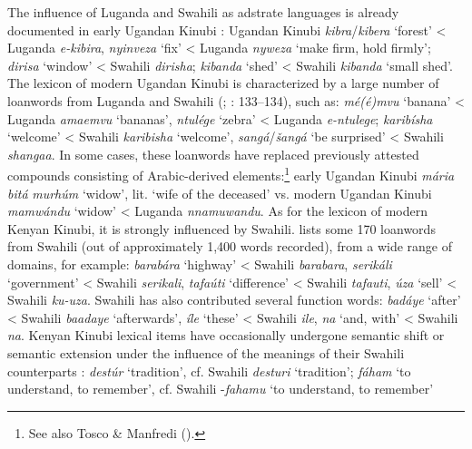 \documentclass[output=paper]{langsci/langscibook}
\begin{document}
The influence of Luganda and Swahili as adstrate languages is already documented in early Ugandan Kinubi \citep{Avram2017talk}: Ugandan Kinubi \textit{kibra}/\textit{kibera} ‘forest’ < Luganda \textit{e-kibira}, \textit{nyinveza} ‘fix’ < Luganda \textit{nyweza} ‘make firm, hold firmly’; \textit{dirisa} ‘window’ < Swahili \textit{dirisha}; \textit{kibanda} ‘shed’ < Swahili \textit{kibanda} ‘small shed’. The lexicon of modern Ugandan Kinubi is characterized by a large number of loanwords from Luganda and Swahili (\citealt{Wellens2003}; \citealt{Nakao2012}: 133–134), such as: \textit{mé(é}\textit{)mvu} ‘banana’ < Luganda \textit{amaemvu} ‘bananas’, \textit{ntulége} ‘zebra’ < Luganda \textit{e-ntulege}; \textit{karibísha} ‘welcome’ < Swahili \textit{karibisha} ‘welcome’, \textit{sangá}/\textit{šangá} ‘be surprised’ < Swahili \textit{shangaa}. In some cases, these loanwords have replaced previously attested compounds consisting of Arabic-derived elements:\footnote{See also Tosco \& Manfredi (\citeyear[509]{ToscoManfredi2013}).} early Ugandan Kinubi \textit{mária} \textit{bitá} \textit{murhúm} ‘widow’, lit. ‘wife of the deceased’ vs. modern Ugandan Kinubi \textit{mamwándu} ‘widow’ < Luganda \textit{nnamuwandu}. As for the lexicon of modern Kenyan Kinubi, it is strongly influenced by Swahili. \citet{Luffin2004} lists some 170 loanwords from Swahili (out of approximately 1,400 words recorded), from a wide range of domains, for example: \textit{barabára} ‘highway’ < Swahili \textit{barabara}, \textit{serikáli} ‘government’ < Swahili \textit{serikali}, \textit{tafaúti} ‘difference’ < Swahili \textit{tafauti}, \textit{úza} ‘sell’ < Swahili \textit{ku-uza}. Swahili has also contributed several function words: \textit{badáye} ‘after’ < Swahili \textit{baadaye} ‘afterwards’, \textit{íle} ‘these’ < Swahili \textit{ile}, \textit{na} ‘and, with’ < Swahili \textit{na}. Kenyan Kinubi lexical items have occasionally undergone semantic shift or semantic extension under the influence of the meanings of their Swahili counterparts \citep[315]{Luffin2014}: \textit{destúr} ‘tradition’, cf. Swahili \textit{desturi} ‘tradition’; \textit{fáham} ‘to understand, to remember’, cf. Swahili -\textit{fahamu} ‘to understand, to remember’ 
\end{document}
